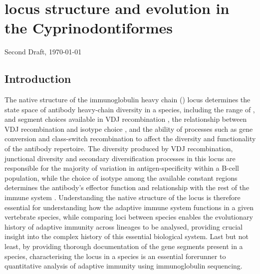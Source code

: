 
\chapter{\igh{} locus structure and evolution in the Cyprinodontiformes}  
\label{chap:locus}
\onehalfspacing

\ifdefineChapter
	{\LARGE Second Draft, \today}
\fi

\pagebreak


\section{Introduction}

The native structure of the immunoglobulin heavy chain (\igh{}) locus determines the state space of antibody heavy-chain diversity in a species, including the range of \vh, \dh and \jh segment choices available in VDJ recombination \parencite{jung2006vdjr}, the relationship between VDJ recombination and isotype choice \parencite{fillatreau2013astonishing}, and the ability of processes such as gene conversion \parencite{wysocki1989conversion} and class-switch recombination \parencite{magor2015affinity,patel2018aid} to affect the diversity and functionality of the antibody repertoire. The diversity produced by VDJ recombination, junctional diversity and secondary diversification processes in this locus are responsible for the majority of variation in antigen-specificity within a B-cell population, while the choice of isotype among the available \igh{} constant regions determines the antibody's effector function and relationship with the rest of the immune system \parencite{schroeder2010immunoglobulins}. Understanding the native structure of the \igh{} locus is therefore essential for understanding how the adaptive immune system functions in a given vertebrate species, while comparing loci between species enables the evolutionary history of adaptive immunity across lineages to be analysed, providing crucial insight into the complex history of this essential biological system. Last but not least, by providing thorough documentation of the \igh{} gene segments present in a species, characterising the \igh{} locus in a species is an essential forerunner to quantitative analysis of adaptive immunity using immunoglobulin sequencing.

